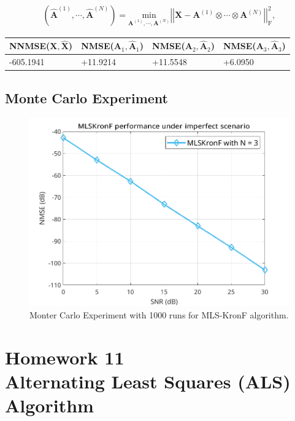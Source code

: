 \documentclass[a4paper,10pt]{article}
\begin{document}
    \begin{align}
        \left(\hat{\boldsymbol{A}}^{(1)}, \cdots, \hat{\boldsymbol{A}}^{(N)}\right) = \underset{\boldsymbol{A}^{(1)}, \cdots, \boldsymbol{A}^{(N)}}{\text{min}} \left|\left| \boldsymbol{X} - \boldsymbol{A}^{(1)} \otimes \cdots \otimes \boldsymbol{A}^{(N)} \right|\right|^2_{\text{F}},
    \end{align}

    \begin{table}[ht!]
        \centering
        \begin{tabular}{|l|l|l|l|}
        \hline
        NNMSE($\boldsymbol{X}, \boldsymbol{\hat{X}}$) & NMSE($\boldsymbol{A}_{1}, \boldsymbol{\hat{A}}_{1}$) & NMSE($\boldsymbol{A}_{2}, \boldsymbol{\hat{A}}_{2}$) & NMSE($\boldsymbol{A}_{3}, \boldsymbol{\hat{A}}_{3}$) \\ \hline
        -605.1941 & +11.9214 & +11.5548 & +6.0950 \\ \hline
        \end{tabular}
    \end{table}

    \subsection*{Monte Carlo Experiment}

    \begin{figure}[ht!]
        \centering 
        \includegraphics[width=0.75\linewidth]{figs/hw10.png} \par 
        \caption{Monter Carlo Experiment with 1000 runs for MLS-KronF algorithm.}
        \label{fig:hw10} 
    \end{figure}

\newpage
\section*{Homework 11 \\ Alternating Least Squares (ALS) Algorithm}
\end{document}
